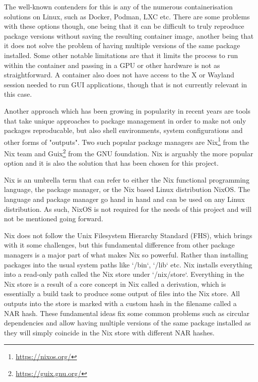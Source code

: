 The well-known contenders for this is any of the numerous containerisation solutions on Linux, such as Docker, Podman, LXC etc. There are some problems with these options though, one being that it can be difficult to truly reproduce package versions without saving the resulting container image, another being that it does not solve the problem of having multiple versions of the same package installed. Some other notable limitations are that it limits the process to run within the container and passing in a GPU or other hardware is not as straightforward. A container also does not have access to the X or Wayland session needed to run GUI applications, though that is not currently relevant in this case.

Another approach which has been growing in popularity in recent years are tools that take unique approaches to package management in order to make not only packages reproducable, but also shell environments, system configurations and other forms of "outputs". Two such popular package managers are Nix\footnote{\url{https://nixos.org/}} from the Nix team and Guix\footnote{\url{https://guix.gnu.org/}} from the GNU foundation. Nix is arguably the more popular option and it is also the solution that has been chosen for this project.

Nix is an umbrella term that can refer to either the Nix functional programming language, the package manager, or the Nix based Linux distribution NixOS. The language and package manager go hand in hand and can be used on any Linux distribution. As such, NixOS is not required for the needs of this project and will not be mentioned going forward.

Nix does not follow the Unix Filesystem Hierarchy Standard (FHS), which brings with it some challenges, but this fundamental difference from other package managers is a major part of what makes Nix so powerful.
Rather than installing packages into the usual system paths like `/bin`, `/lib` etc. Nix installs everything into a read-only path called the Nix store under `/nix/store`.
Everything in the Nix store is a result of a core concept in Nix called a derivation, which is essentially a build task to produce some output of files into the Nix store.
All outputs into the store is marked with a custom hash in the filename called a NAR hash. These fundamental ideas fix some common problems such as circular dependencies and allow having multiple versions of the same package installed as they will simply coincide in the Nix store with different NAR hashes.

